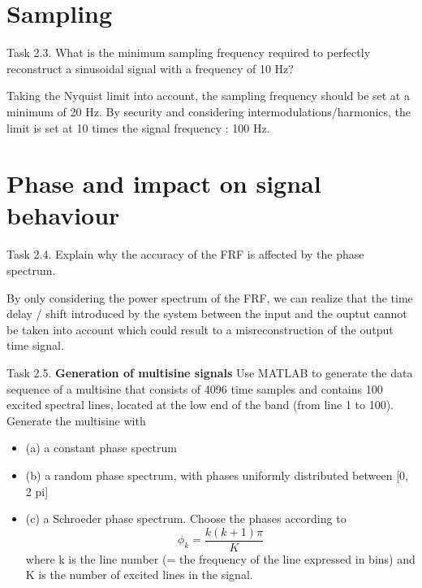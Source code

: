 \section{Sampling}

\begin{Task}{Task 2.3.}
    What is the minimum sampling frequency required to perfectly
    reconstruct a sinusoidal signal with a frequency of 10 Hz?
\end{Task}

Taking the Nyquist limit into account, the sampling frequency should be set at a minimum of 20 Hz.
By security and considering intermodulations/harmonics, the limit is set at 10 times the signal frequency : 100 Hz.

\section{Phase and impact on signal behaviour}

\begin{Task}{Task 2.4.}
    Explain why the accuracy of the FRF is affected by the phase spectrum.
\end{Task}

By only considering the power spectrum of the FRF, we can realize that the time delay / shift introduced by the system between
 the input and the ouptut cannot be taken into account which could result to a misreconstruction of the output time signal.

\begin{Task}{Task 2.5.}
    \textbf{Generation of multisine signals} Use MATLAB to generate the
    data sequence of a multisine that consists of 4096 time samples and contains 100 excited
    spectral lines, located at the low end of the band (from line 1 to 100). Generate
    the multisine with
    \begin{itemize}
        \item (a) a constant phase spectrum
        \item (b) a random phase spectrum, with phases uniformly distributed between [0, 2 pi]
        \item (c) a Schroeder phase spectrum. Choose the phases according to
        \begin{equation*}
            \phi_k = \frac{k(k+1)\pi}{K}
        \end{equation*}
        where k is the line number (= the frequency of the line expressed in bins) and
        K is the number of excited lines in the signal.
    \end{itemize}
\end{Task}

